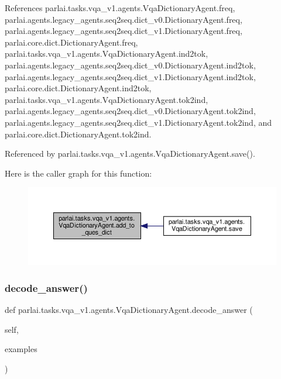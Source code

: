 References parlai.\+tasks.\+vqa\+\_\+v1.\+agents.\+Vqa\+Dictionary\+Agent.\+freq, parlai.\+agents.\+legacy\+\_\+agents.\+seq2seq.\+dict\+\_\+v0.\+Dictionary\+Agent.\+freq, parlai.\+agents.\+legacy\+\_\+agents.\+seq2seq.\+dict\+\_\+v1.\+Dictionary\+Agent.\+freq, parlai.\+core.\+dict.\+Dictionary\+Agent.\+freq, parlai.\+tasks.\+vqa\+\_\+v1.\+agents.\+Vqa\+Dictionary\+Agent.\+ind2tok, parlai.\+agents.\+legacy\+\_\+agents.\+seq2seq.\+dict\+\_\+v0.\+Dictionary\+Agent.\+ind2tok, parlai.\+agents.\+legacy\+\_\+agents.\+seq2seq.\+dict\+\_\+v1.\+Dictionary\+Agent.\+ind2tok, parlai.\+core.\+dict.\+Dictionary\+Agent.\+ind2tok, parlai.\+tasks.\+vqa\+\_\+v1.\+agents.\+Vqa\+Dictionary\+Agent.\+tok2ind, parlai.\+agents.\+legacy\+\_\+agents.\+seq2seq.\+dict\+\_\+v0.\+Dictionary\+Agent.\+tok2ind, parlai.\+agents.\+legacy\+\_\+agents.\+seq2seq.\+dict\+\_\+v1.\+Dictionary\+Agent.\+tok2ind, and parlai.\+core.\+dict.\+Dictionary\+Agent.\+tok2ind.



Referenced by parlai.\+tasks.\+vqa\+\_\+v1.\+agents.\+Vqa\+Dictionary\+Agent.\+save().

Here is the caller graph for this function\+:
\nopagebreak
\begin{figure}[H]
\begin{center}
\leavevmode
\includegraphics[width=350pt]{classparlai_1_1tasks_1_1vqa__v1_1_1agents_1_1VqaDictionaryAgent_aebfab302e4b8b2b4ac74723a047cca18_icgraph}
\end{center}
\end{figure}
\mbox{\label{classparlai_1_1tasks_1_1vqa__v1_1_1agents_1_1VqaDictionaryAgent_a9e857a32d09fd4b4e09c80e11a1f947b}} 
\subsubsection{\texorpdfstring{decode\+\_\+answer()}{decode\_answer()}}
{\footnotesize\ttfamily def parlai.\+tasks.\+vqa\+\_\+v1.\+agents.\+Vqa\+Dictionary\+Agent.\+decode\+\_\+answer (\begin{DoxyParamCaption}\item[{}]{self,  }\item[{}]{examples }\end{DoxyParamCaption})}



